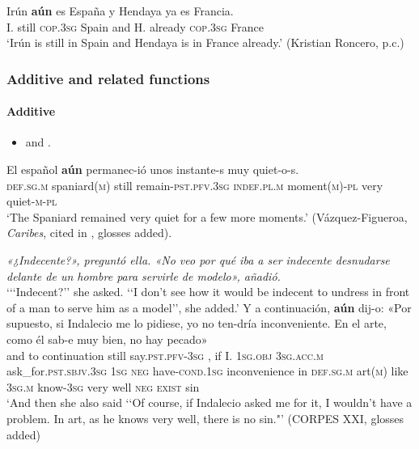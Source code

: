 \begin{exe}
	\ex\label{exAppendixSpanishAunMarginal4}
	\gll Irún \textbf{aún} es España y Hendaya ya es Francia.\\
	I. still \textsc{cop}.3\textsc{sg} Spain and H. already \textsc{cop}.3\textsc{sg} France\\
	\glt \lq Irún is still in Spain and Hendaya is in France already.\rq{ }(Kristian Roncero, p.c.)
\end{exe}


\subsubsection{Additive and related functions}
\paragraph{Additive}\label{appendixSpanishAunAdditive}\largerpage[2]
\begin{itemize}
	\item \textcite{Garrido1993} and \textcite[§§30.8r, 40.8b]{RAEGramatica}.
\end{itemize}

\begin{exe}
	\ex
	\gll El español \textbf{aún} permanec-ió unos instante-s muy quiet-o-s.\\
	\textsc{def}.\textsc{sg}.\textsc{m} spaniard(\textsc{m}) still remain-\textsc{pst}.\textsc{pfv}.3\textsc{sg} \textsc{indef}.\textsc{pl}.\textsc{m} moment(\textsc{m})-\textsc{pl} very quiet-\textsc{m}-\textsc{pl}\\
	\glt \lq The Spaniard remained very quiet for a few more moments.' (Vázquez-Figueroa, \textit{Caribes}, cited in \cite[§30.8r]{RAEGramatica}, glosses added).
	
	\ex \textit{«¿Indecente?», preguntó ella. «No veo por qué iba a ser indecente desnudarse delante de un hombre para servirle de modelo», añadió.}\\
	\lq {\lq\lq}Indecent?\rq\rq{ }she asked. \lq\lq I don't see how it would be indecent to undress in front of a man to serve him as a model\rq\rq, she added.\rq
	\exi{}\gll  Y a continuación, \textbf{aún} dij-o: «{Por supuesto}, si Indalecio me lo pidiese, yo no ten-dría inconveniente. En el arte, como él sab-e muy bien, no hay pecado»\\
	and to continuation still  say.\textsc{pst}.\textsc{pfv}-3\textsc{sg} \phantom{«}{of course}, if I. 1\textsc{sg}.\textsc{obj} 3\textsc{sg}.\textsc{acc}.\textsc{m} ask\_for.\textsc{pst}.\textsc{sbjv}.3\textsc{sg} 1\textsc{sg} \textsc{neg} have-\textsc{cond}.1\textsc{sg} inconvenience in \textsc{def}.\textsc{sg}.\textsc{m} art(\textsc{m}) like 3\textsc{sg}.\textsc{m} know-3\textsc{sg} very well \textsc{neg} \textsc{exist} sin\\
	\glt \lq And then she also said \lq\lq Of course, if Indalecio asked me for it, I wouldn't have a problem. In art, as he knows very well, there is no sin."' (CORPES XXI, glosses added)
\end{exe}

